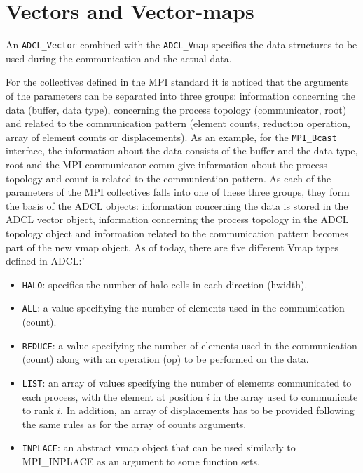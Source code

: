 \section{Vectors and Vector-maps}

An {\tt ADCL\_Vector} combined with the {\tt ADCL\_Vmap} specifies the data
structures  to be used during the communication and the actual data. 

For the collectives defined in the MPI standard it is noticed that the
arguments of the parameters can be separated into three groups: information
concerning the data (buffer, data type), concerning the process topology
(communicator, root) and related to the communication pattern (element counts,
reduction operation, array of element counts or displacements). As an example,
for the {\tt MPI\_Bcast} interface, the information about the data consists of
the buffer and the data type, root and the MPI communicator comm give
information about the process topology and count is related to the
communication pattern. As each of the parameters of the MPI collectives falls
into one of these three groups, they form the basis of the ADCL objects:
information concerning the data is stored in the ADCL vector object,
information concerning the process topology in the ADCL topology object and
information related to the communication pattern becomes part of the new vmap
object. As of today, there are five different Vmap types defined in ADCL:'
\begin{itemize}
\item {\tt HALO}: specifies the number of halo-cells in each direction (hwidth).
\item {\tt ALL}: a value specifiying the number of elements used in the
  communication (count).
\item{\tt REDUCE}: a value specifying the number of elements used in the
  communication (count) along  with an operation (op) to be performed on the
  data.
\item{\tt LIST}: an array of values specifying the number of elements
  communicated to each process, with the element at position $i$ in the array
  used to communicate to rank $i$. In addition, an array of displacements has
  to be provided following the same rules as for the array of counts
  arguments.
\item{\tt INPLACE}: an abstract vmap object that can be used similarly to
  MPI\_INPLACE as an argument to some function sets.

\end{itemize}

